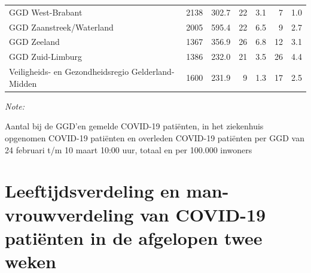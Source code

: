 \documentclass[
  english,
  man,floatsintext]{apa6}
\begin{document}
\begin{table}
\begin{threeparttable}
\begin{tabular}{lrrrrrr}
GGD West-Brabant & 2138 & 302.7 & 22 & 3.1 & 7 & 1.0\\
GGD Zaanstreek/Waterland & 2005 & 595.4 & 22 & 6.5 & 9 & 2.7\\
GGD Zeeland & 1367 & 356.9 & 26 & 6.8 & 12 & 3.1\\
GGD Zuid-Limburg & 1386 & 232.0 & 21 & 3.5 & 26 & 4.4\\
Veiligheids- en Gezondheidsregio Gelderland-Midden & 1600 & 231.9 & 9 & 1.3 & 17 & 2.5\\
\bottomrule
\end{tabular}
\begin{tablenotes}
\item \textit{Note: } 
\item Aantal bij de GGD’en gemelde COVID-19 patiënten, in het ziekenhuis opgenomen COVID-19 patiënten en overleden COVID-19 patiënten per GGD van 24 februari t/m 10 maart 10:00 uur, totaal en per 100.000 inwoners
\end{tablenotes}
\end{threeparttable}
\endgroup{}
\end{table}

\newpage

\hypertarget{leeftijdsverdeling-en-man-vrouwverdeling-van-covid-19-patiuxebnten-in-de-afgelopen-twee-weken}{%
\section{Leeftijdsverdeling en man-vrouwverdeling van COVID-19 patiënten in de afgelopen twee weken}\label{leeftijdsverdeling-en-man-vrouwverdeling-van-covid-19-patiuxebnten-in-de-afgelopen-twee-weken}}
\end{document}
